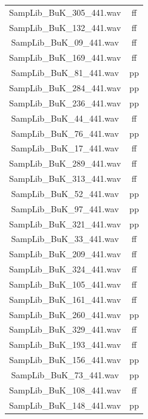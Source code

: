 \begin{table}[H]
\begin{minipage}[b]{0.4\textwidth}
\begin{tabular}{ | c | c | }
    SampLib\_BuK\_305\_441.wav & ff \\
    SampLib\_BuK\_132\_441.wav & ff \\
    SampLib\_BuK\_09\_441.wav & ff \\
    SampLib\_BuK\_169\_441.wav & ff \\
    SampLib\_BuK\_81\_441.wav & pp \\
    SampLib\_BuK\_284\_441.wav & pp \\
    SampLib\_BuK\_236\_441.wav & pp \\
    SampLib\_BuK\_44\_441.wav & ff \\
    SampLib\_BuK\_76\_441.wav & pp \\
    SampLib\_BuK\_17\_441.wav & ff \\
    SampLib\_BuK\_289\_441.wav & ff \\
    SampLib\_BuK\_313\_441.wav & ff \\
    SampLib\_BuK\_52\_441.wav & pp \\
    SampLib\_BuK\_97\_441.wav & pp \\
    SampLib\_BuK\_321\_441.wav & pp \\
    SampLib\_BuK\_33\_441.wav & ff \\
    SampLib\_BuK\_209\_441.wav & ff \\
    SampLib\_BuK\_324\_441.wav & ff \\
    SampLib\_BuK\_105\_441.wav & ff \\
    SampLib\_BuK\_161\_441.wav & ff \\
    SampLib\_BuK\_260\_441.wav & pp \\
    SampLib\_BuK\_329\_441.wav & ff \\
    SampLib\_BuK\_193\_441.wav & ff \\
    SampLib\_BuK\_156\_441.wav & pp \\
    SampLib\_BuK\_73\_441.wav & pp \\
    SampLib\_BuK\_108\_441.wav & ff \\
    SampLib\_BuK\_148\_441.wav & pp \\
    \hline
    \end{tabular}
  \end{minipage}

\hfill
\end{table}
